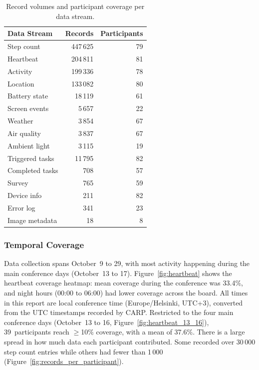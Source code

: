 \documentclass[11pt,a4paper]{article}
\begin{document}
\begin{table}[H]
\centering
\caption{Record volumes and participant coverage per data stream.}
\label{tab:streams}
\small
\begin{tabular}{lrr}
\toprule
\textbf{Data Stream} & \textbf{Records} & \textbf{Participants} \\
\midrule
Step count      & 447\,625  & 79 \\
Heartbeat       & 204\,811  & 81 \\
Activity        & 199\,336  & 78 \\
Location        & 133\,082  & 80 \\
Battery state   &  18\,119  & 61 \\
Screen events   &   5\,657  & 22 \\
Weather         &   3\,854  & 67 \\
Air quality     &   3\,837  & 67 \\
Ambient light   &   3\,115  & 19 \\
Triggered tasks &  11\,795  & 82 \\
Completed tasks &      708  & 57 \\
Survey          &      765  & 59 \\
Device info     &      211  & 82 \\
Error log       &      341  & 23 \\
Image metadata  &       18  &  8 \\
\bottomrule
\end{tabular}
\end{table}

\subsubsection{Temporal Coverage}

Data collection spans October~9 to 29, with most activity happening during the main conference days (October~13 to 17).
Figure~\ref{fig:heartbeat} shows the heartbeat coverage heatmap: mean coverage during the conference was 33.4\%, and night hours (00:00 to 06:00) had lower coverage across the board.
All times in this report are local conference time (Europe/Helsinki, UTC+3), converted from the UTC timestamps recorded by CARP.
Restricted to the four main conference days (October~13 to 16, Figure~\ref{fig:heartbeat_13_16}), 39~participants reach $\geq$10\% coverage, with a mean of 37.6\%.
There is a large spread in how much data each participant contributed. Some recorded over 30\,000 step count entries while others had fewer than 1\,000 (Figure~\ref{fig:records_per_participant}).
\end{document}
